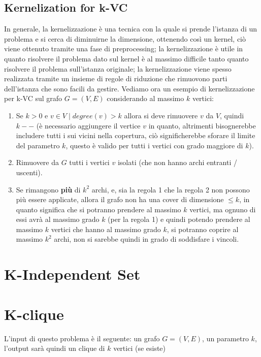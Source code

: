\documentclass[12pt,a4paper]{article}
\begin{document}
\subsection{Kernelization for k-VC}
In generale, la kernelizzazione è una tecnica con la quale si prende l'istanza di un problema e si cerca di diminuirne la dimensione, ottenendo così un kernel, ciò viene ottenuto tramite una fase di preprocessing; la kernelizzazione è utile in quanto risolvere il problema dato sul kernel è al massimo difficile tanto quanto risolvere il problema sull'istanza originale; la kernelizzazione viene spesso realizzata tramite un insieme di regole di riduzione che rimuovono parti dell'istanza che sono facili da gestire. Vediamo ora un esempio di kernelizzazione per k-VC sul grafo $G = (V, E)$ considerando al massimo $k$ vertici:
\begin{enumerate}
\item Se $k > 0$ e $v \in V \mid degree(v) > k$ allora si deve rimuovere $v$ da $V$, quindi $k--$ (è necessario aggiungere il vertice $v$ in quanto, altrimenti bisognerebbe includere tutti i sui vicini nella copertura, ciò significherebbe sforare il limite del parametro $k$, questo è valido per tutti i vertici con grado maggiore di $k$).
\item Rimuovere da $G$ tutti i vertici $v$ isolati (che non hanno archi entranti / uscenti).
\item Se rimangono \textbf{più} di $k^2$ archi, e, sia la regola 1 che la regola 2 non possono più essere applicate, allora il grafo non ha una cover di dimensione $\leq k$, in quanto significa che si potranno prendere al massimo $k$ vertici, ma ognuno di essi avrà al massimo grado $k$ (per la regola 1) e quindi potendo prendere al massimo $k$ vertici che hanno al massimo grado $k$, si potranno coprire al massimo $k^2$ archi, non si sarebbe quindi in grado di soddisfare i vincoli.
\end{enumerate}

\section{K-Independent Set}

\section{K-clique}
L'input di questo problema è il seguente: un grafo $G = (V, E)$, un parametro $k$, l'output sarà quindi un clique di $k$ vertici (se esiste)
\end{document}
